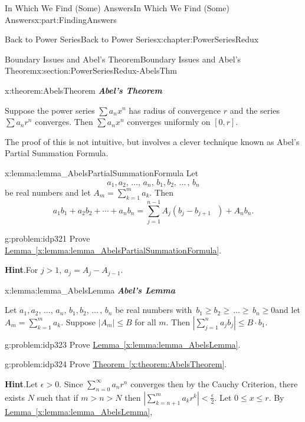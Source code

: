 \documentclass[oneside,10pt,]{book}
\newcommand{\blocktitlefont}{\relax}
\newcommand{\xreffont}{\relax}
\newcommand{\alert}[1]{\textbf{\textit{#1}}}
\numberwithin{equation}{section}
\newcommand{\abs}[1]{\left|#1\right|}
\newcommand{\lt}{<}
\begin{document}
\begin{partptx}{In Which We Find (Some) Answers}{}{In Which We Find (Some) Answers}{}{}{x:part:FindingAnswers}
\begin{chapterptx}{Back to Power Series}{}{Back to Power Series}{}{}{x:chapter:PowerSeriesRedux}
\begin{sectionptx}{Boundary Issues and Abel's Theorem}{}{Boundary Issues and Abel's Theorem}{}{}{x:section:PowerSeriesRedux-AbelsThm}
\begin{theorem}{}{}{x:theorem:AbelsTheorem}%
\alert{Abel's Theorem}%
\par
{} Suppose the power series \(\sum a_nx^n\) has radius of convergence \(r\) and the series \(\sum a_nr^n\) converges. Then \(\sum a_nx^n\) converges uniformly on \([0, r]\).%
\end{theorem}
The proof of this is not intuitive, but involves a clever technique known as Abel's Partial Summation Formula.%
\begin{lemma}{}{}{x:lemma:lemma_AbelsPartialSummationFormula}%
Let%
\begin{equation*}
a_1,a_2,\,\ldots,\,a_n,\,b_1,b_2,\,\ldots\,,\,b_n
\end{equation*}
be real numbers and let \(A_m=\sum_{k=1}^ma_k\). Then%
\begin{equation*}
a_1b_1+a_2b_2+\cdots+a_nb_n=\sum_{j=1}^{n-1}A_j\left(b_j-b_{j+1}\text{ } \right)+A_nb_n\text{.}
\end{equation*}
%
\end{lemma}
\begin{problem}{}{g:problem:idp321}%
Prove \hyperref[x:lemma:lemma_AbelsPartialSummationFormula]{Lemma~{\xreffont\ref{x:lemma:lemma_AbelsPartialSummationFormula}}}.%
\par\smallskip%
\noindent\textbf{\blocktitlefont Hint}.\hypertarget{g:hint:idp322}{}\quad{}For \(j>1\), \(a_j=A_j-A_{j-1}\).%
\end{problem}
\begin{lemma}{}{}{x:lemma:lemma_AbelsLemma}%
\alert{Abel's Lemma}%
\par
Let \(a_1,a_2,\,\ldots,\,a_n,\,b_1,b_2,\,\ldots\,,\,b_n\) be real numbers with \(\,b_1\geq b_2\geq\,\ldots\geq\,b_n\geq 0\)and let \(A_m=\sum_{k=1}^ma_k\). Suppose \(|A_m|\leq B\) for all \(m\). Then \(|\sum_{j=1}^na_jb_j|\leq B\cdot b_1\).%
\end{lemma}
\begin{problem}{}{g:problem:idp323}%
 Prove \hyperref[x:lemma:lemma_AbelsLemma]{Lemma~{\xreffont\ref{x:lemma:lemma_AbelsLemma}}}.%
\end{problem}
\begin{problem}{}{g:problem:idp324}%
Prove \hyperref[x:theorem:AbelsTheorem]{Theorem~{\xreffont\ref{x:theorem:AbelsTheorem}}}.%
\par\smallskip%
\noindent\textbf{\blocktitlefont Hint}.\hypertarget{g:hint:idp325}{}\quad{}Let \(\epsilon>0\). Since \(\sum_{n=0}^\infty a_nr^n\) converges then by the Cauchy Criterion, there exists \(N\) such that if \(m>n>N\) then \(\abs{\sum_{k=n+1}^ma_kr^k}\lt \frac{\epsilon}{2}\). Let \(0\leq x\leq r\). By \hyperref[x:lemma:lemma_AbelsLemma]{Lemma~{\xreffont\ref{x:lemma:lemma_AbelsLemma}}},%

\end{problem}
\end{sectionptx}
\end{chapterptx}
\end{partptx}
\end{document}
